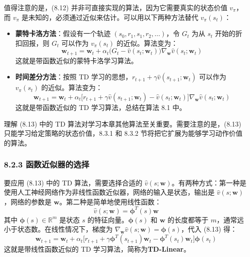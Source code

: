 \documentclass[UTF8]{article}
\begin{document}
值得注意的是，(8.12) 并非可直接实现的算法，因为它需要真实的状态价值 $v_\pi$，而 $v_\pi$ 是未知的，必须通过近似来估计。可以用以下两种方法替代 $v_\pi(s_t)$：

\begin{itemize}
    \item \textbf{蒙特卡洛方法}：假设有一个轨迹 $(s_0, r_1, s_1, r_2, \dots)$，令 $G_t$ 为从 $s_t$ 开始的折扣回报，则 $G_t$ 可以作为 $v_\pi(s_t)$ 的近似。算法变为：
    \[
    \boldsymbol{w}_{t+1} = \boldsymbol{w}_t + \alpha_t \big(G_t - \hat{v}(s_t; \boldsymbol{w}_t)\big) \nabla_{\boldsymbol{w}} \hat{v}(s_t; \boldsymbol{w}_t)
    \]
    这就是带函数近似的蒙特卡洛学习算法。
    
    \item \textbf{时间差分方法}：按照 TD 学习的思想，$r_{t+1} + \gamma \hat{v}(s_{t+1}; \boldsymbol{w}_t)$ 可以作为 $v_\pi(s_t)$ 的近似。算法变为：
    \begin{equation}
    \label{eq:td_fa}
    \boldsymbol{w}_{t+1} = \boldsymbol{w}_t + \alpha_t \big[r_{t+1} + \gamma \hat{v}(s_{t+1}; \boldsymbol{w}_t) - \hat{v}(s_t; \boldsymbol{w}_t)\big] \nabla_{\boldsymbol{w}} \hat{v}(s_t; \boldsymbol{w}_t)
    \end{equation}
    这就是带函数近似的 TD 学习算法，总结在算法 8.1 中。
\end{itemize}

理解 (8.13) 中的 TD 算法对学习本章其他算法至关重要。需要注意的是，(8.13) 只能学习给定策略的状态价值，8.3.1 和 8.3.2 节将把它扩展为能够学习动作价值的算法。

\subsubsection*{8.2.3 函数近似器的选择}

要应用 (8.13) 中的 TD 算法，需要选择合适的 $\hat{v}(s; \boldsymbol{w})$。有两种方式：第一种是使用人工神经网络作为非线性函数近似器，网络的输入是状态，输出是 $\hat{v}(s; \boldsymbol{w})$，网络的参数是 $\boldsymbol{w}$。第二种是简单地使用线性函数：
\[
\hat{v}(s; \boldsymbol{w}) = \boldsymbol{\phi}^T(s) \boldsymbol{w}
\]
其中 $\boldsymbol{\phi}(s) \in \mathbb{R}^m$ 是状态 $s$ 的特征向量。$\boldsymbol{\phi}(s)$ 和 $\boldsymbol{w}$ 的长度都等于 $m$，通常远小于状态数。在线性情况下，梯度为 $\nabla_{\boldsymbol{w}} \hat{v}(s; \boldsymbol{w}) = \boldsymbol{\phi}(s)$，代入 (8.13) 得：
\begin{equation}
\label{eq:td_linear}
\boldsymbol{w}_{t+1} = \boldsymbol{w}_t + \alpha_t \big[r_{t+1} + \gamma \boldsymbol{\phi}^T(s_{t+1})\boldsymbol{w}_t - \boldsymbol{\phi}^T(s_t)\boldsymbol{w}_t\big] \boldsymbol{\phi}(s_t)
\end{equation}
这就是带线性函数近似的 TD 学习算法，简称为\textbf{TD-Linear}。
\end{document}
